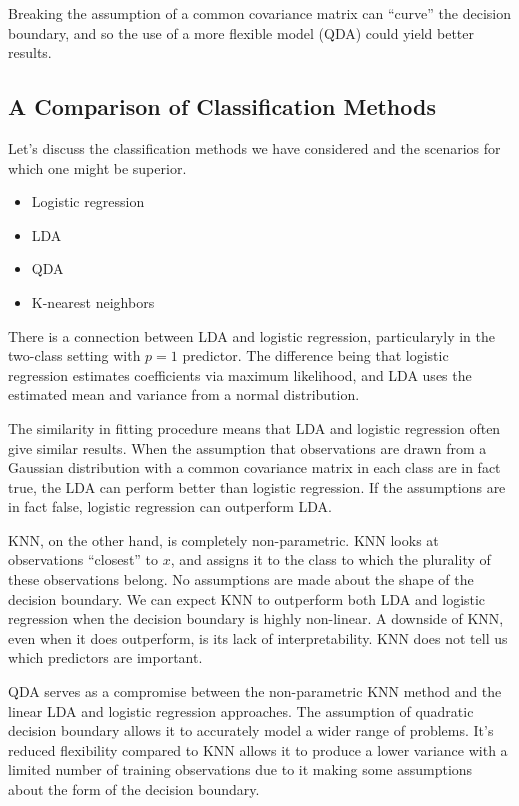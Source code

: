 \documentclass[
]{article}
\providecommand{\tightlist}{%
  \setlength{\itemsep}{0pt}\setlength{\parskip}{0pt}}
\begin{document}
Breaking the assumption of a common covariance matrix can ``curve'' the
decision boundary, and so the use of a more flexible model (QDA) could
yield better results.

\hypertarget{a-comparison-of-classification-methods}{%
\subsection{A Comparison of Classification
Methods}\label{a-comparison-of-classification-methods}}

Let's discuss the classification methods we have considered and the
scenarios for which one might be superior.

\begin{itemize}
\tightlist
\item
  Logistic regression
\item
  LDA
\item
  QDA
\item
  K-nearest neighbors
\end{itemize}

There is a connection between LDA and logistic regression, particularyly
in the two-class setting with \(p=1\) predictor. The difference being
that logistic regression estimates coefficients via maximum likelihood,
and LDA uses the estimated mean and variance from a normal distribution.

The similarity in fitting procedure means that LDA and logistic
regression often give similar results. When the assumption that
observations are drawn from a Gaussian distribution with a common
covariance matrix in each class are in fact true, the LDA can perform
better than logistic regression. If the assumptions are in fact false,
logistic regression can outperform LDA.

KNN, on the other hand, is completely non-parametric. KNN looks at
observations ``closest'' to \(x\), and assigns it to the class to which
the plurality of these observations belong. No assumptions are made
about the shape of the decision boundary. We can expect KNN to
outperform both LDA and logistic regression when the decision boundary
is highly non-linear. A downside of KNN, even when it does outperform,
is its lack of interpretability. KNN does not tell us which predictors
are important.

QDA serves as a compromise between the non-parametric KNN method and the
linear LDA and logistic regression approaches. The assumption of
quadratic decision boundary allows it to accurately model a wider range
of problems. It's reduced flexibility compared to KNN allows it to
produce a lower variance with a limited number of training observations
due to it making some assumptions about the form of the decision
boundary.
\end{document}
